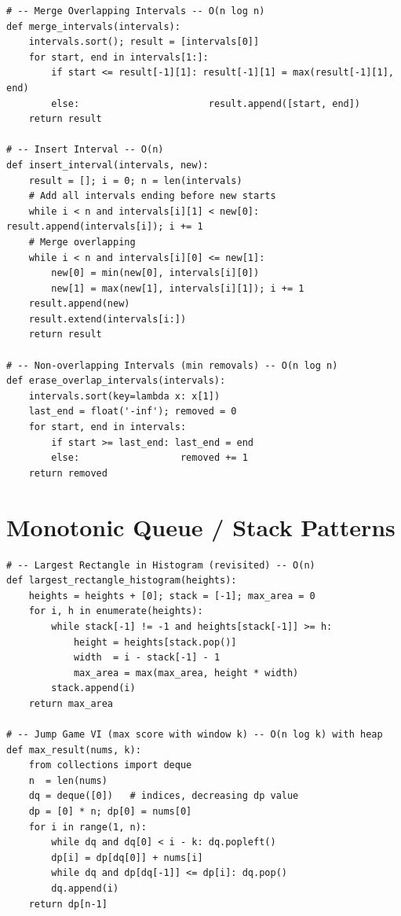 \documentclass[11pt,a4paper]{report}
\begin{document}
\begin{lstlisting}
# -- Merge Overlapping Intervals -- O(n log n)
def merge_intervals(intervals):
    intervals.sort(); result = [intervals[0]]
    for start, end in intervals[1:]:
        if start <= result[-1][1]: result[-1][1] = max(result[-1][1], end)
        else:                       result.append([start, end])
    return result

# -- Insert Interval -- O(n)
def insert_interval(intervals, new):
    result = []; i = 0; n = len(intervals)
    # Add all intervals ending before new starts
    while i < n and intervals[i][1] < new[0]: result.append(intervals[i]); i += 1
    # Merge overlapping
    while i < n and intervals[i][0] <= new[1]:
        new[0] = min(new[0], intervals[i][0])
        new[1] = max(new[1], intervals[i][1]); i += 1
    result.append(new)
    result.extend(intervals[i:])
    return result

# -- Non-overlapping Intervals (min removals) -- O(n log n)
def erase_overlap_intervals(intervals):
    intervals.sort(key=lambda x: x[1])
    last_end = float('-inf'); removed = 0
    for start, end in intervals:
        if start >= last_end: last_end = end
        else:                  removed += 1
    return removed
\end{lstlisting}

\section{Monotonic Queue / Stack Patterns}

\begin{lstlisting}
# -- Largest Rectangle in Histogram (revisited) -- O(n)
def largest_rectangle_histogram(heights):
    heights = heights + [0]; stack = [-1]; max_area = 0
    for i, h in enumerate(heights):
        while stack[-1] != -1 and heights[stack[-1]] >= h:
            height = heights[stack.pop()]
            width  = i - stack[-1] - 1
            max_area = max(max_area, height * width)
        stack.append(i)
    return max_area

# -- Jump Game VI (max score with window k) -- O(n log k) with heap
def max_result(nums, k):
    from collections import deque
    n  = len(nums)
    dq = deque([0])   # indices, decreasing dp value
    dp = [0] * n; dp[0] = nums[0]
    for i in range(1, n):
        while dq and dq[0] < i - k: dq.popleft()
        dp[i] = dp[dq[0]] + nums[i]
        while dq and dp[dq[-1]] <= dp[i]: dq.pop()
        dq.append(i)
    return dp[n-1]
\end{lstlisting}
\end{document}

